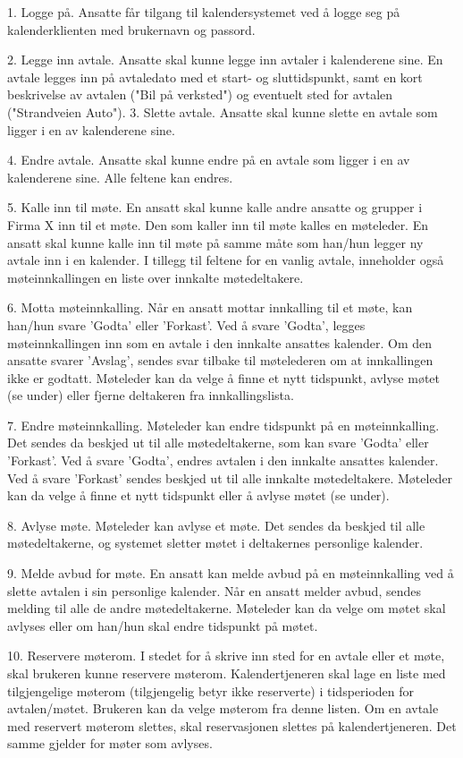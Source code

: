 1. Logge på. Ansatte får tilgang til kalendersystemet ved å logge seg på kalenderklienten
med brukernavn og passord.


2. Legge inn avtale. Ansatte skal kunne legge inn avtaler i kalenderene sine. En avtale
legges inn på avtaledato med et start- og sluttidspunkt, samt en kort beskrivelse av
avtalen ("Bil på verksted") og eventuelt sted for avtalen ("Strandveien Auto").
3. Slette avtale. Ansatte skal kunne slette en avtale som ligger i en av kalenderene sine.


4. Endre avtale. Ansatte skal kunne endre på en avtale som ligger i en av kalenderene
sine. Alle feltene kan endres.



5. Kalle inn til møte. En ansatt skal kunne kalle andre ansatte og grupper i Firma X inn til
et møte. Den som kaller inn til møte kalles en møteleder. En ansatt skal kunne kalle
inn til møte på samme måte som han/hun legger ny avtale inn i en kalender. I tillegg til
feltene for en vanlig avtale, inneholder også møteinnkallingen en liste over innkalte
møtedeltakere.


6. Motta møteinnkalling. Når en ansatt mottar innkalling til et møte, kan han/hun svare
'Godta' eller 'Forkast'. Ved å svare 'Godta', legges møteinnkallingen inn som en avtale
i den innkalte ansattes kalender. Om den ansatte svarer 'Avslag', sendes svar tilbake til
møtelederen om at innkallingen ikke er godtatt. Møteleder kan da velge å finne et nytt
tidspunkt, avlyse møtet (se under) eller fjerne deltakeren fra innkallingslista.


7. Endre møteinnkalling. Møteleder kan endre tidspunkt på en møteinnkalling. Det
sendes da beskjed ut til alle møtedeltakerne, som kan svare 'Godta' eller 'Forkast'. Ved
å svare 'Godta', endres avtalen i den innkalte ansattes kalender. Ved å svare 'Forkast'
sendes beskjed ut til alle innkalte møtedeltakere. Møteleder kan da velge å finne et
nytt tidspunkt eller å avlyse møtet (se under).


8. Avlyse møte. Møteleder kan avlyse et møte. Det sendes da beskjed til alle
møtedeltakerne, og systemet sletter møtet i deltakernes personlige kalender.


9. Melde avbud for møte. En ansatt kan melde avbud på en møteinnkalling ved å slette
avtalen i sin personlige kalender. Når en ansatt melder avbud, sendes melding til alle
de andre møtedeltakerne. Møteleder kan da velge om møtet skal avlyses eller om
han/hun skal endre tidspunkt på møtet.


10. Reservere møterom. I stedet for å skrive inn sted for en avtale eller et møte, skal
brukeren kunne reservere møterom. Kalendertjeneren skal lage en liste med
tilgjengelige møterom (tilgjengelig betyr ikke reserverte) i tidsperioden for
avtalen/møtet. Brukeren kan da velge møterom fra denne listen. Om en avtale med
reservert møterom slettes, skal reservasjonen slettes på kalendertjeneren. Det samme
gjelder for møter som avlyses.


